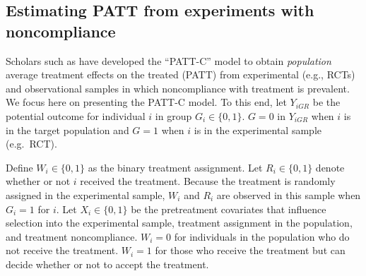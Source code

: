 \begin{table}[!h]
    \centering
    \label{tab:pseudoR}
\end{table}

\subsection{Estimating PATT from experiments with noncompliance}\label{estimating-patt-from-experiments-with-noncompliance}

Scholars such as \citet{ottoboni2020PATT} have developed the ``PATT-C'' model
to obtain \emph{population} average treatment effects on the treated (PATT)
from experimental (e.g., RCTs) and observational samples in which
noncompliance with treatment is prevalent. We focus here on presenting
the PATT-C model. To this end, let \(Y_{iGR}\) be the potential outcome
for individual \(i\) in group \(G_{i}\in\{0,1\}.\) \(G=0\) in \(Y_{iGR}\) when
\(i\) is in the target population and \(G=1\) when \(i\) is in the
experimental sample (e.g.~RCT).

Define \(W_{i}\in\{0,1\}\) as the binary treatment assignment. Let
\(R_{i}\in\{0,1\}\) denote whether or not \(i\) received the treatment.
Because the treatment is randomly assigned in the experimental sample,
\(W_{i}\) and \(R_{i}\) are observed in this sample when \(G_{i}=1\) for \(i\).
Let \(X_{i}\in\{0,1\}\) be the pretreatment covariates that influence
selection into the experimental sample, treatment assignment in the
population, and treatment noncompliance. \(W_{i}=0\) for individuals in
the population who do not receive the treatment. \(W_{i}=1\) for those who
receive the treatment but can decide whether or not to accept the
treatment.

